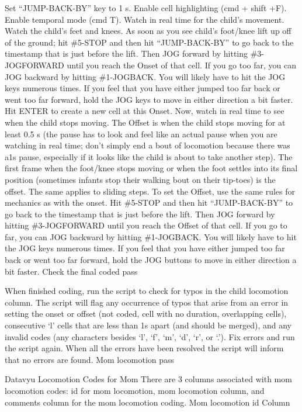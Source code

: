 \documentclass[
]{book}
\begin{document}
Set ``JUMP-BACK-BY'' key to 1 s.
Enable cell highlighting (cmd + shift +F). Enable temporal mode (cmd T).
Watch in real time for the child's movement.
Watch the child's feet and knees.
As soon as you see child's foot/knee lift up off of the ground; hit \#5-STOP and then hit ``JUMP-BACK-BY'' to go back to the timestamp that is just before the lift. Then JOG forward by hitting \#3-JOGFORWARD until you reach the Onset of that cell. If you go too far, you can JOG backward by hitting \#1-JOGBACK. You will likely have to hit the JOG keys numerous times. If you feel that you have either jumped too far back or went too far forward, hold the JOG keys to move in either direction a bit faster. Hit ENTER to create a new cell at this Onset.
Now, watch in real time to see when the child stops moving. The Offset is when the child stops moving for at least 0.5 s (the pause has to look and feel like an actual pause when you are watching in real time; don't simply end a bout of locomotion because there was a1s pause, especially if it looks like the child is about to take another step). The first frame when the foot/knee stops moving or when the foot settles into its final position (sometimes infants stop their walking bout on their tip-toes) is the offset. The same applies to sliding steps.
To set the Offset, use the same rules for mechanics as with the onset. Hit \#5-STOP and then hit ``JUMP-BACK-BY'' to go back to the timestamp that is just before the lift. Then JOG forward by hitting \#3-JOGFORWARD until you reach the Offset of that cell. If you go to far, you can JOG backward by hitting \#1-JOGBACK. You will likely have to hit the JOG keys numerous times. If you feel that you have either jumped too far back or went too far forward, hold the JOG buttons to move in either direction a bit faster.
Check the final coded pass

When finished coding, run the script to check for typos in the child locomotion column. The script will flag any occurrence of typos that arise from an error in setting the onset or offset (not coded, cell with no duration, overlapping cells), consecutive `l' cells that are less than 1s apart (and should be merged), and any invalid codes (any characters besides `l', `f', `m', `d', `r', or `.'). Fix errors and run the script again. When all the errors have been resolved the script will inform that no errors are found.
Mom locomotion pass

Datavyu Locomotion Codes for Mom
There are 3 columns associated with mom locomotion codes: id for mom locomotion, mom locomotion column, and comments column for the mom locomotion coding.
Mom locomotion id Column
\end{document}
